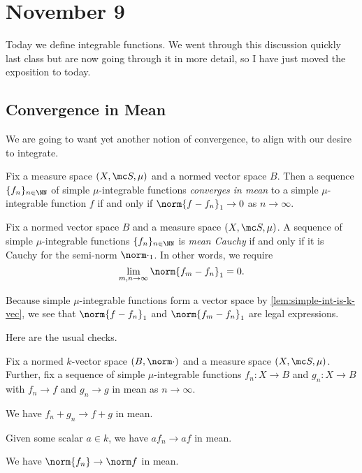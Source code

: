 \documentclass[../notes.tex]{subfiles}
\begin{document}
\section{November 9}

Today we define integrable functions. We went through this discussion quickly last class but are now going through it in more detail, so I have just moved the exposition to today.

\subsection{Convergence in Mean}
We are going to want yet another notion of convergence, to align with our desire to integrate.
\begin{defi}
	Fix a measure space $(X,\mc S,\mu)$ and a normed vector space $B$. Then a sequence $\{f_n\}_{n\in\NN}$ of simple $\mu$-integrable functions \textit{converges in mean} to a simple $\mu$-integrable function $f$ if and only if $\norm{f-f_n}_1\to0$ as $n\to\infty$.
\end{defi}
\begin{defi}
	Fix a normed vector space $B$ and a measure space $(X,\mc S,\mu)$. A sequence of simple $\mu$-integrable functions $\{f_n\}_{n\in\NN}$ is \textit{mean Cauchy} if and only if it is Cauchy for the semi-norm $\norm\cdot_1$. In other words, we require
	\[\lim_{m,n\to\infty}\norm{f_m-f_n}_1=0.\]
\end{defi}
\begin{remark}
	Because simple $\mu$-integrable functions form a vector space by \autoref{lem:simple-int-is-k-vec}, we see that $\norm{f-f_n}_1$ and $\norm{f_m-f_n}_1$ are legal expressions.
\end{remark}
Here are the usual checks.
\begin{lemma}
	Fix a normed $k$-vector space $(B,\norm\cdot)$ and a measure space $(X,\mc S,\mu)$. Further, fix a sequence of simple $\mu$-integrable functions $f_n\colon X\to B$ and $g_n\colon X\to B$ with $f_n\to f$ and $g_n\to g$ in mean as $n\to\infty$.
	\begin{listalph}
		\item We have $f_n+g_n\to f+g$ in mean.
		\item Given some scalar $a\in k$, we have $af_n\to af$ in mean.
		\item We have $\norm{f_n}\to\norm f$ in mean.
	\end{listalph}
\end{lemma}
\end{document}

